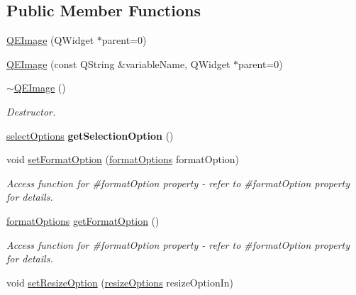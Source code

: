\subsection*{Public Member Functions}
\begin{DoxyCompactItemize}
\item 
\hyperlink{classQEImage_a1e7bf6d2793afd09086176a8e598ee8d}{QEImage} (QWidget $\ast$parent=0)
\item 
\hyperlink{classQEImage_a2f18e9129d8d8686336dbde6eb85cd0f}{QEImage} (const QString \&variableName, QWidget $\ast$parent=0)
\item 
\hypertarget{classQEImage_a5e7548652c069edfc7a251d41d4d6101}{
\hyperlink{classQEImage_a5e7548652c069edfc7a251d41d4d6101}{$\sim$QEImage} ()}
\label{classQEImage_a5e7548652c069edfc7a251d41d4d6101}

\begin{DoxyCompactList}\small\item\em Destructor. \end{DoxyCompactList}\item 
\hypertarget{classQEImage_a9cac34ec15ce43942640e11364cb70c9}{
\hyperlink{classQEImage_a2a0f3fb145abdf77229de456573b3360}{selectOptions} {\bfseries getSelectionOption} ()}
\label{classQEImage_a9cac34ec15ce43942640e11364cb70c9}

\item 
\hypertarget{classQEImage_a1be5940ddf433781fc1c1fbcaac8bc7a}{
void \hyperlink{classQEImage_a1be5940ddf433781fc1c1fbcaac8bc7a}{setFormatOption} (\hyperlink{classQEImage_aec1df5ac4b48c529744b48de7722c55e}{formatOptions} formatOption)}
\label{classQEImage_a1be5940ddf433781fc1c1fbcaac8bc7a}

\begin{DoxyCompactList}\small\item\em Access function for \#formatOption property -\/ refer to \#formatOption property for details. \end{DoxyCompactList}\item 
\hypertarget{classQEImage_a68c788b405657244fdc068035c7a38b7}{
\hyperlink{classQEImage_aec1df5ac4b48c529744b48de7722c55e}{formatOptions} \hyperlink{classQEImage_a68c788b405657244fdc068035c7a38b7}{getFormatOption} ()}
\label{classQEImage_a68c788b405657244fdc068035c7a38b7}

\begin{DoxyCompactList}\small\item\em Access function for \#formatOption property -\/ refer to \#formatOption property for details. \end{DoxyCompactList}\item 
\hypertarget{classQEImage_a4f72994301c690c30308daf493462385}{
void \hyperlink{classQEImage_a4f72994301c690c30308daf493462385}{setResizeOption} (\hyperlink{classQEImage_ab70b57397dad6bbe6e659f9831a481dd}{resizeOptions} resizeOptionIn)}
\label{classQEImage_a4f72994301c690c30308daf493462385}


\end{DoxyCompactItemize}
